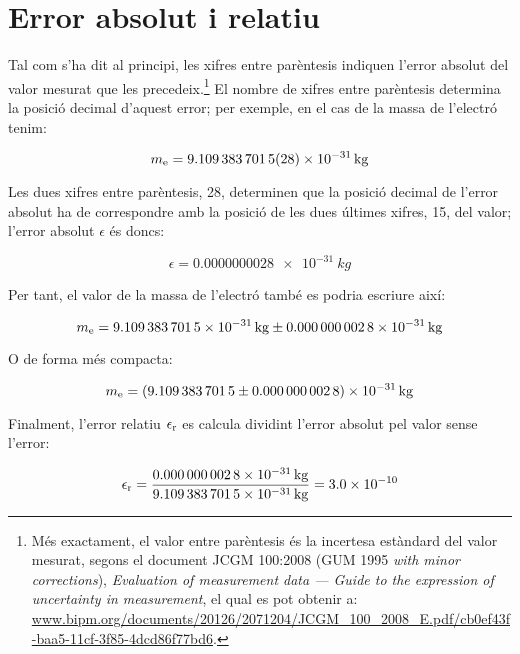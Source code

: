   
 
   
  
  
  
  
  
 \index{$\sigma$}  


\section{Error absolut i relatiu}\label{sec:err_abs_rel}

Tal com s'ha dit al principi, les xifres entre parèntesis indiquen l'error absolut del valor mesurat que les precedeix.\footnote{Més exactament, el valor entre parèntesis és la incertesa estàndard del valor mesurat, segons el document JCGM 100:2008 (GUM 1995 \textit{with minor
corrections}), \textit{Evaluation of measurement data --- Guide to the expression of uncertainty in
measurement}, el qual es pot obtenir a:  \href{https://www.bipm.org/documents/20126/2071204/JCGM\_100\_2008\_E.pdf/cb0ef43f-baa5-11cf-3f85-4dcd86f77bd6}{www.bipm.org/documents/20126/2071204/JCGM\_100\_2008\_E.pdf/cb0ef43f-baa5-11cf-3f85-4dcd86f77bd6}.} El nombre de xifres entre parèntesis determina la posició decimal d'aquest error; per exemple, en el cas de la  massa de l'electró tenim:

\[
    m_\mathrm{e} = \qty{9,109 383 7015(28) e-31}{kg}
\]

Les dues xifres entre parèntesis, 28, determinen que la posició decimal de l'error absolut ha de correspondre amb la posició de les dues últimes xifres, 15, del valor; l'error absolut $\epsilon$  és doncs:

\[
    \epsilon = \qty{0,000 000 0028 e-31}{kg}
\]

Per tant, el valor de la massa de l'electró també es podria escriure així:

 \[
    m\ped{e} = \qty[separate-uncertainty,separate-uncertainty-units = repeat]{9,109 383 7015(28) e-31}{kg}
\]

O de forma més compacta:

\[
m\ped{e} = \qty[separate-uncertainty,separate-uncertainty-units = bracket]{9,109 383 7015(28) e-31}{kg}
\]

Finalment, l'error relatiu $\epsilon_\mathrm{r}$ es calcula dividint l'error absolut pel valor sense l'error:

\[
    \epsilon_\mathrm{r} = \frac{\qty{0,000 000 0028 e-31}{kg}}{\qty{9,109 383 7015 e-31}{kg}} =   \num{3,0e-10}
\]
